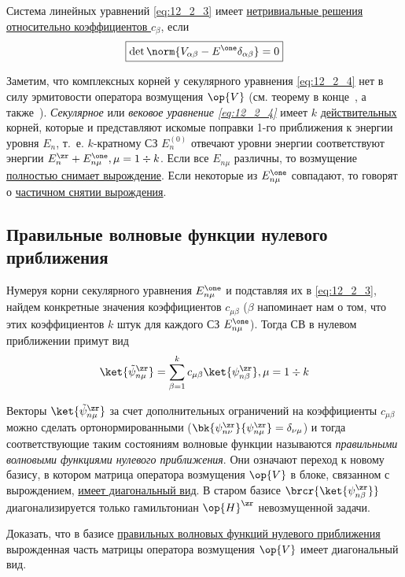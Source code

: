 Система линейных уравнений \eqref{eq:12_2_3} имеет \underline{нетривиальные решения относительно коэффициентов $c_\beta$}, если 
\begin{equation}
\label{eq:12_2_4}
\boxed{\det \norm{V_{\alpha \beta} - E^\one \delta_{\alpha \beta}} = 0}
\end{equation}

Заметим, что комплексных корней у секулярного уравнения \eqref{eq:12_2_4} нет в силу эрмитовости оператора возмущения $\op{V}$  (см. теорему в конце~, а также~). {\em Секулярное} или {\em вековое уравнение \eqref{eq:12_2_4}} имеет $k$ \underline{действительных} корней, которые и представляют искомые поправки 1-го приближения к энергии уровня $E_n$, т.~е. $k$-кратному СЗ $E_n^{(0)}$ отвечают уровни энергии соответствуют энергии $E_n^\zr + E_{n \mu} ^\one, \mu = 1 \div k$. Если все $E_{n \mu}$ различны, то возмущение \underline{полностью снимает вырождение}. Если некоторые из $E_{n \mu} ^\one$ совпадают, то говорят о \underline{частичном снятии вырождения}.

\subsection{Правильные волновые функции нулевого приближения}

Нумеруя корни секулярного уравнения $E_{n \mu} ^\one$ и подставляя их в \eqref{eq:12_2_3}, найдем конкретные значения коэффициентов
$c_{\mu \beta}$ ($\beta$ напоминает нам о том, что этих коэффициентов $k$ штук для каждого СЗ $E_{n \mu} ^\one$). Тогда СВ в нулевом приближении примут вид
$$
\ket{\tilde{\psi}_{n \mu}^\zr} = \sum_{\beta=1}^k c_{\mu \beta} \ket{\psi_{n \beta}^\zr}, \mu = 1 \div k
$$

Векторы $\ket{\tilde{\psi}_{n \mu}^\zr}$ за счет дополнительных ограничений на коэффициенты $c_{\mu \beta}$ можно сделать ортонормированными ($\bk{\psi_{n \nu}^\zr}{\psi_{n \mu}^\zr} = \delta_{\nu \mu}$) и тогда соответствующие таким состояниям волновые функции называются {\em правильными волновыми функциями нулевого приближения}. Они означают переход к новому базису, в котором матрица оператора возмущения $\op{V}$ в блоке, связанном с вырождением, \underline{имеет диагональный вид}. В старом базисе $\brcr{\ket{\psi_{n \beta} ^\zr}}$ диагонализируется только гамильтониан $\op{H}^\zr$ невозмущенной задачи.

\begin{excr}
Доказать, что в базисе \underline{правильных волновых функций нулевого приближения} вырожденная часть матрицы оператора возмущения $\op{V}$ имеет диагональный вид.
\end{excr}

